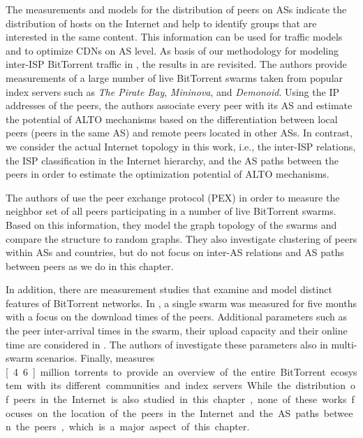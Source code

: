 The measurements and models for the distribution of peers on ASs indicate the distribution of hosts on the Internet and help to identify groups that are interested in the same content.
This information can be used for traffic models and to optimize CDNs on AS level.
As basis of our methodology for modeling inter-ISP BitTorrent traffic in , the results in \cite{Hossfeld2011} are revisited. The authors provide measurements of a large number of live BitTorrent swarms taken from popular index servers such as \emph{The Pirate Bay}, \emph{Mininova}, and \emph{Demonoid}. Using the IP addresses of the peers, the authors associate every peer with its AS and estimate the potential of ALTO mechanisms based on the differentiation between local peers (peers in the same AS) and remote peers located in other ASs. In contrast, we consider the actual Internet topology in this work, i.e., the inter-ISP relations, the ISP classification in the Internet hierarchy, and the AS paths between the peers in order to estimate the optimization potential of ALTO mechanisms.

The authors of \cite{Kryczka2011} use the peer exchange protocol (PEX) in order to measure the neighbor set of all peers participating in a number of live BitTorrent swarms. Based on this information, they model the graph topology of the swarms and compare the structure to random graphs. They also investigate clustering of peers within ASs and countries, but do not focus on inter-AS relations and AS paths between peers as we do in this chapter.

In addition, there are measurement studies that examine and model distinct features of BitTorrent networks. In \cite{Izal2004}, a single swarm was measured for five months with a focus on the download times of the peers. Additional parameters such as the peer inter-arrival times in the swarm, their upload capacity and their online time are considered in \cite{Pouwelse2005}. The authors of \cite{Guo2005} investigate these parameters also in multi-swarm scenarios. Finally, \cite{Zhang2010} measures \unit[4.6]{million} torrents to provide an overview of the entire BitTorrent ecosystem with its different communities and index servers.
While the distribution of peers in the Internet is also studied in this chapter, none of these works focuses on the location of the peers in the Internet and the AS paths between the peers, which is a major aspect of this chapter.

